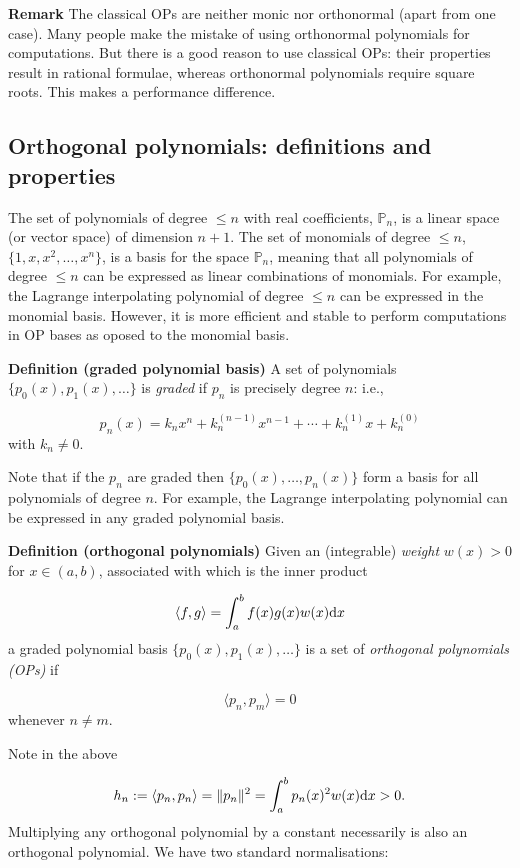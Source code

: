 \documentclass[12pt,a4paper]{article}
\begin{document}
\textbf{Remark} The classical OPs are neither monic nor orthonormal (apart from one case). Many people make the mistake of using orthonormal polynomials for computations. But there is a good reason to use classical OPs: their properties result in rational formulae, whereas orthonormal polynomials require square roots. This makes a performance difference.

\subsection{Orthogonal polynomials: definitions and properties}
The set of polynomials of degree $\leq n$ with real coefficients, $\mathbb{P}_n$, is a linear space (or vector space) of dimension $n+1$.  The set of  monomials of degree $\leq n$, $\lbrace 1, x, x^2, \ldots, x^n \rbrace$, is a basis for the space $\mathbb{P}_n$, meaning that all polynomials of degree $\leq n$ can be expressed as linear combinations of monomials.  For example, the Lagrange interpolating polynomial of degree $\leq n$ can be expressed in the monomial basis.  However,  it is more efficient and stable to perform computations in OP bases as oposed to the monomial basis.

\textbf{Definition (graded polynomial basis)} A set of polynomials $\{p_0(x), p_1(x), \ensuremath{\ldots} \}$ is \emph{graded} if $p_n$ is precisely degree $n$: i.e.,

\[
p_n(x) = k_n x^n + k_n^{(n-1)} x^{n-1} + \ensuremath{\cdots} + k_n^{(1)} x + k_n^{(0)}
\]
with $k_n \ensuremath{\ne} 0$.

Note that if the $p_n$ are graded then $\{p_0(x), \ensuremath{\ldots}, p_n(x) \}$ form a basis for all polynomials of degree $n$.  For example, the Lagrange interpolating polynomial can be expressed in any graded polynomial basis.

\textbf{Definition (orthogonal polynomials)} Given an (integrable) \emph{weight} $w(x) > 0$ for $x \ensuremath{\in} (a,b)$, associated with which is the inner product

\[
\ensuremath{\langle}f,g\ensuremath{\rangle} = \ensuremath{\int}_a^b  f(x) g(x) w(x) {\rm d} x
\]
a graded polynomial basis $\{p_0(x), p_1(x), \ensuremath{\ldots} \}$ is a set of \emph{orthogonal polynomials (OPs)} if

\[
\ensuremath{\langle}p_n,p_m\ensuremath{\rangle} = 0
\]
whenever $n \ensuremath{\ne} m$.

Note in the above

\[
h_n := \ensuremath{\langle}p_n,p_n\ensuremath{\rangle} = \|p_n\|^2 = \ensuremath{\int}_a^b  p_n(x)^2 w(x) {\rm d} x > 0.
\]
Multiplying any orthogonal polynomial by a constant necessarily is also an orthogonal polynomial. We have two standard normalisations:
\end{document}
